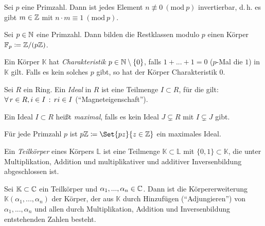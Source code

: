 \documentclass{cheat-sheet}
\newcommand{\K}{\mathbb{K}} %
\newcommand{\Mod}[1]{\ (\text{mod}\ #1)} %
\newcommand{\F}{\mathbb{F}} %
\renewcommand{\L}{\mathbb{L}} %
\begin{document}

\begin{lem}
  Sei $p$ eine Primzahl. Dann ist jedes Element $n \not\equiv 0 \Mod{p}$ invertierbar, d.\,h. es gibt $m \in \mathbb{Z}$ mit $n \cdot m \equiv 1 \Mod{p}$.
\end{lem}

\begin{defn}
  Sei $p \in \mathbb{N}$ eine Primzahl. Dann bilden die Restklassen modulo $p$ einen Körper $\F_p \coloneqq \Z / (p \Z)$.
\end{defn}

\begin{defn}
  Ein Körper $\K$ hat \emph{Charakteristik} $p \in \mathbb{N} \setminus \{ 0 \}$, falls $1 + ... + 1 = 0$ ($p$-Mal die $1$) in $\K$ gilt. Falls es kein solches $p$ gibt, so hat der Körper Charakteristik $0$.
\end{defn}

\begin{defn}
  Sei $R$ ein Ring. Ein \emph{Ideal} in $R$ ist eine Teilmenge $I \subset R$, für die gilt: $\forall \, {r \in R, i \in I} \,:\, ri \in I$ ("`Magneteigenschaft"').
\end{defn}

\begin{defn}
  Ein Ideal $I \subset R$ heißt \emph{maximal}, falls es kein Ideal $J \subsetneq R$ mit $I \subsetneq J$ gibt.
\end{defn}

\begin{bem}
  Für jede Primzahl $p$ ist $p \Z \coloneqq \Set{ pz }{ z \in \Z }$ ein maximales Ideal.
\end{bem}


\begin{defn}
  Ein \emph{Teilkörper} eines Körpers $\L$ ist eine Teilmenge $\K \subset \L$ mit $\{ 0, 1 \} \subset \K$, die unter Multiplikation, Addition und multiplikativer und additiver Inversenbildung abgeschlossen ist.
\end{defn}

\begin{defn}
  Sei $\K \subset \C$ ein Teilkörper und $\alpha_1, ..., \alpha_n \in \mathbb{C}$. Dann ist die Körpererweiterung $\K(\alpha_1, ..., \alpha_n)$ der Körper, der aus $\K$ durch Hinzufügen ("`Adjungieren"') von $\alpha_1, ..., \alpha_n$ und allen durch Multiplikation, Addition und Inversenbildung entstehenden Zahlen besteht.
\end{defn}
\end{document}
